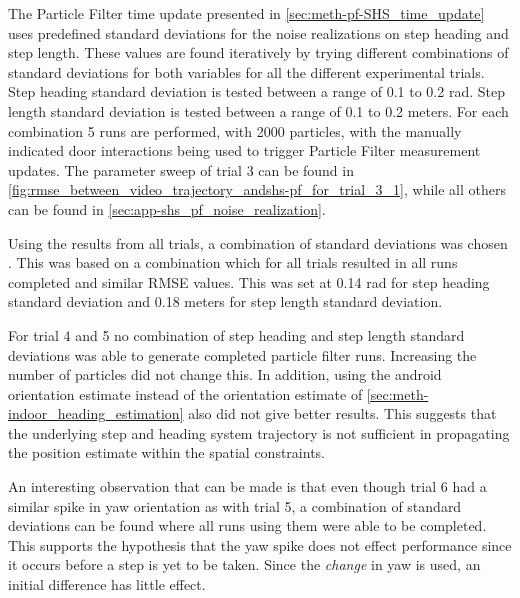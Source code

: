 The Particle Filter time update presented in \cref{sec:meth-pf-SHS_time_update} uses predefined standard deviations for the noise realizations on step heading and step length. These values are found iteratively by trying different combinations of standard deviations for both variables for all the different experimental trials. Step heading standard deviation is tested between a range of 0.1 to 0.2 rad. Step length standard deviation is tested between a range of 0.1 to 0.2 meters. For each combination 5 runs are performed, with 2000 particles, with the manually indicated door interactions being used to trigger Particle Filter measurement updates. The parameter sweep of trial 3 can be found in \cref{fig:rmse_between_video_trajectory_andshs-pf_for_trial_3_1}, while all others can be found in \cref{sec:app-shs_pf_noise_realization}. \par 

Using the results from all trials, a combination of standard deviations was chosen . This was based on a combination which for all trials resulted in all runs completed and similar RMSE values. This was set at 0.14 rad for step heading standard deviation and 0.18 meters for step length standard deviation. \par 

For trial 4 and 5 no combination of step heading and step length standard deviations was able to generate completed particle filter runs. Increasing the number of particles did not change this. In addition, using the android orientation estimate instead of the orientation estimate of \cref{sec:meth-indoor_heading_estimation} also did not give better results. This suggests that the underlying step and heading system trajectory is not sufficient in propagating the position estimate within the spatial constraints. \par

An interesting observation that can be made is that even though trial 6 had a similar spike in yaw orientation as with trial 5, a combination of standard deviations can be found where all runs using them were able to be completed. This supports the hypothesis that the yaw spike does not effect performance since it occurs before a step is yet to be taken. Since the \textit{change} in yaw is used, an initial difference has little effect.

